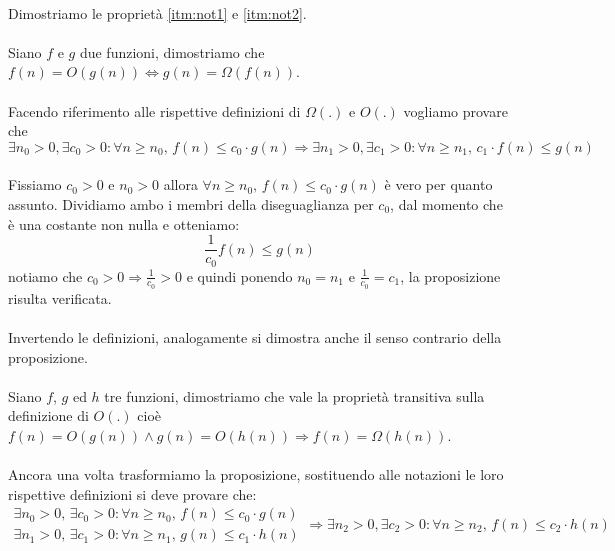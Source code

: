 \documentclass[11pt,a4paper,oneside]{article}
\begin{document}
\paragraph*{} Dimostriamo le proprietà \ref{itm:not1} e \ref{itm:not2}.
\paragraph*{} Siano $f$ e $g$ due funzioni, dimostriamo che $f(n) = O(g(n)) \Leftrightarrow g(n) = \Omega(f(n))$.
\paragraph*{} Facendo riferimento alle rispettive definizioni di $\Omega(.)$ e $O(.)$ vogliamo provare che $$\exists n_0 > 0, \exists c_0 >0 : \forall n \geq n_0,\,f(n) \leq c_0\cdot g(n) \Rightarrow \exists n_1 > 0, \exists c_1 >0 : \forall n \geq n_1,\,c_1\cdot f(n) \leq g(n)$$
\paragraph*{}Fissiamo $c_0 > 0$ e $n_0 > 0$ allora $\forall n \geq n_0,\,f(n)\leq c_0\cdot g(n)$ è vero per quanto assunto. Dividiamo ambo i membri della diseguaglianza per $c_0$, dal momento che è una costante non nulla e otteniamo: $$\frac{1}{c_0}f(n) \leq g(n)$$ notiamo che $c_0 > 0 \Rightarrow \frac{1}{c_0} > 0$ e quindi ponendo $n_0 = n_1$ e $\frac{1}{c_0} = c_1$, la proposizione risulta verificata.
\paragraph*{} Invertendo le definizioni, analogamente si dimostra anche il senso contrario della proposizione.
\paragraph*{} Siano $f$, $g$ ed $h$ tre funzioni, dimostriamo che vale la proprietà transitiva sulla definizione di $O(.)$ cioè $f(n) = O(g(n)) \wedge g(n) = O(h(n)) \Rightarrow f(n) = \Omega(h(n))$.
\paragraph*{} Ancora una volta trasformiamo la proposizione, sostituendo alle notazioni le loro rispettive definizioni si deve provare che:
\[
\begin{array}{l}
\exists n_0 > 0,\, \exists c_0 > 0: \forall n \geq n_0,\,f(n) \leq c_0\cdot g(n) \\
\exists n_1 > 0,\, \exists c_1 > 0: \forall n \geq n_1,\,g(n) \leq c_1\cdot h(n) 
\end{array} \Rightarrow \exists n_2 > 0, \exists c_2 > 0 : \forall n \geq n_2,\,f(n) \leq c_2\cdot h(n)
\]
\end{document}
